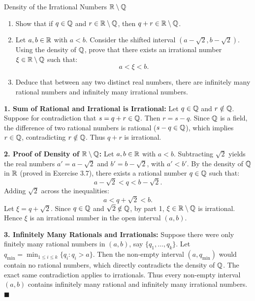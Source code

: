 \begin{exercise}{Density of the Irrational Numbers $\mathbb{R} \setminus \mathbb{Q}$}
\begin{enumerate}[leftmargin=1.5em,itemsep=2pt]
  \item Show that if $q \in \mathbb{Q}$ and $r \in \mathbb{R} \setminus \mathbb{Q}$, then $q + r \in \mathbb{R} \setminus \mathbb{Q}$.
  \item Let $a, b \in \mathbb{R}$ with $a < b$. Consider the shifted interval $\left(a - \sqrt{2}, b - \sqrt{2}\right)$.
  Using the density of $\mathbb{Q}$, prove that there exists an irrational number $\xi \in \mathbb{R} \setminus \mathbb{Q}$ such that:
  \[
  a < \xi < b.
  \]
  \item Deduce that between any two distinct real numbers, there are infinitely many rational numbers and infinitely many irrational numbers.
\end{enumerate}
\end{exercise}

\begin{tabletworkspace}[5.0cm]
\end{tabletworkspace}

\begin{solution}
\textbf{1. Sum of Rational and Irrational is Irrational:}
Let $q \in \mathbb{Q}$ and $r \notin \mathbb{Q}$.
Suppose for contradiction that $s = q + r \in \mathbb{Q}$.
Then $r = s - q$. Since $\mathbb{Q}$ is a field, the difference of two rational numbers is rational ($s - q \in \mathbb{Q}$), which implies $r \in \mathbb{Q}$, contradicting $r \notin \mathbb{Q}$.
Thus $q + r$ is irrational.

\textbf{2. Proof of Density of $\mathbb{R} \setminus \mathbb{Q}$:}
Let $a, b \in \mathbb{R}$ with $a < b$.
Subtracting $\sqrt{2}$ yields the real numbers $a' = a - \sqrt{2}$ and $b' = b - \sqrt{2}$, with $a' < b'$.
By the density of $\mathbb{Q}$ in $\mathbb{R}$ (proved in Exercise 3.7), there exists a rational number $q \in \mathbb{Q}$ such that:
\[
a - \sqrt{2} < q < b - \sqrt{2}.
\]
Adding $\sqrt{2}$ across the inequalities:
\[
a < q + \sqrt{2} < b.
\]
Let $\xi = q + \sqrt{2}$. Since $q \in \mathbb{Q}$ and $\sqrt{2} \notin \mathbb{Q}$, by part 1, $\xi \in \mathbb{R} \setminus \mathbb{Q}$ is irrational.
Hence $\xi$ is an irrational number in the open interval $(a, b)$.

\textbf{3. Infinitely Many Rationals and Irrationals:}
Suppose there were only finitely many rational numbers in $(a, b)$, say $\{q_1, \dots, q_k\}$.
Let $q_{\min} = \min_{1 \le i \le k} \{q_i : q_i > a\}$.
Then the non-empty interval $(a, q_{\min})$ would contain no rational numbers, which directly contradicts the density of $\mathbb{Q}$.
The exact same contradiction applies to irrationals.
Thus every non-empty interval $(a, b)$ contains infinitely many rational and infinitely many irrational numbers. \hfill $\blacksquare$
\end{solution}


